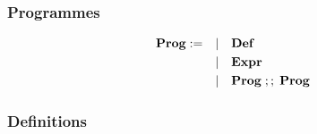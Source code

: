 \documentclass[
  12pt,
]{article}
\begin{document}
\hypertarget{programmes}{%
  \subsubsection{Programmes}\label{programmes}}

\begin{align*}
  \bf{Prog} := \quad & |\quad \bf{Def}                     \\
                     & |\quad \bf{Expr}                    \\
                     & |\quad \bf{Prog} \; ;; \; \bf{Prog}
\end{align*}

\hypertarget{definitions}{%
  \subsubsection{Definitions}\label{definitions}}
\end{document}
